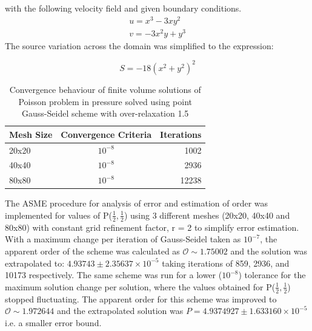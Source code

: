 \documentclass[a4paper,10pt]{article}
\begin{document}
\begin{itemize}
    with the following velocity field and given boundary conditions.
    \begin{eqnarray}
      u = x^3 - 3xy^2\\
      v = -3x^2y + y^3
    \end{eqnarray}
    The source variation across the domain was simplified to the expression:
    
    \begin{equation}
      S = -18{(x^2 + y^2)}^2
    \end{equation}
    \begin{table}
      \begin{center}
        \begin{tabular}{|l | c | r|}
          \hline
          Mesh Size & Convergence Criteria & Iterations\\
          \hline
          20x20 & $10^{-8}$ & 1002\\
          40x40 & $10^{-8}$ & 2936\\
          80x80 & $10^{-8}$ & 12238\\
          \hline
        \end{tabular}
        \caption{Convergence behaviour of finite volume solutions of Poisson problem in pressure solved using point Gauss-Seidel scheme with over-relaxation 1.5}
        \label{table:norm2}      
      \end{center}
    \end{table}

    
    The ASME procedure for analysis of error and estimation of order was implemented for values of P($\frac{1}{2},\frac{1}{2}$) using 3 different meshes (20x20, 40x40 and 80x80) with constant grid refinement factor, r = 2 to simplify error estimation. With a maximum change per iteration of Gauss-Seidel taken as $10^{-7}$, the apparent order of the scheme was calculated as $\mathcal{O} \sim 1.75002$ and the solution was extrapolated to: $4.93743 \pm 2.35637 \times 10^{-5}$ taking iterations of 859, 2936, and 10173 respectively. The same scheme was run for a lower ($10^{-8}$) tolerance for the maximum solution change per solution, where the values obtained for P($\frac{1}{2},\frac{1}{2}$) stopped fluctuating. The apparent order for this scheme was improved to $\mathcal{O} \sim 1.972644$ and the extrapolated solution was $P = 4.9374927 \pm 1.633160 \times 10^{-5}$ i.e. a smaller error bound.

\end{itemize}
\end{document}
